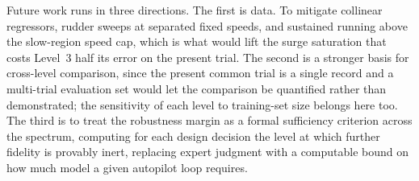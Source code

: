 \documentclass[conference]{IEEEtran}
\begin{document}
Future work runs in three directions. The first is data. To mitigate collinear regressors, rudder sweeps at separated fixed speeds, and sustained running above the slow-region speed cap, which is what would lift the surge saturation that costs Level~3 half its error on the present trial. The second is a stronger basis for cross-level comparison, since the present common trial is a single record and a multi-trial evaluation set would let the comparison be quantified rather than demonstrated; the sensitivity of each level to training-set size belongs here too. The third is to treat the robustness margin as a formal sufficiency criterion across the spectrum, computing for each design decision the level at which further fidelity is provably inert, replacing expert judgment with a computable bound on how much model a given autopilot loop requires.



\end{document}
